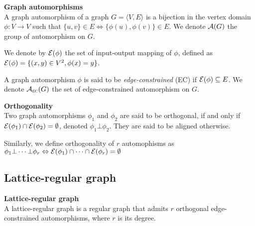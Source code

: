 
\begin{definition}\textbf{Graph automorphisms}\\
A graph automorphism of a graph $G = \langle V,E \rangle$ is a bijection in the vertex domain $\phi: V \rightarrow V$ such that $\{u,v\} \in E \Leftrightarrow \{\phi(u), \phi(v)\} \in E$. We denote $\mathcal{A}(G)$ the group of automorphism on $G$.

We denote by $\mathcal{E}(\phi)$ the set of input-output mapping of $\phi$, defined as $\mathcal{E}(\phi) = \{ (x,y) \in V^2, \phi(x) = y \}$.

A graph automorphism $\phi$ is said to be \emph{edge-constrained} (EC) if $\mathcal{E}(\phi) \subseteq E$. We denote $\mathcal{A}_{\operatorname{\textsc{ec}}}(G)$ the set of edge-constrained automorphism on $G$.
\end{definition}

\begin{definition}\textbf{Orthogonality}\\
Two graph automorphisms $\phi_1$ and $\phi_2$ are said to be orthogonal, if and only if $\mathcal{E}(\phi_1) \cap \mathcal{E}(\phi_2) = \emptyset$, denoted $\phi_1 \bot \phi_2$. They are said to be aligned otherwise.

Similarly, we define orthogonality of $r$ automophisms as $\phi_1 \bot \cdots \bot \phi_r \Leftrightarrow \mathcal{E}(\phi_1) \cap \cdots \cap \mathcal{E}(\phi_r) = \emptyset$
\end{definition}


\subsection{Lattice-regular graph}


\begin{definition}\textbf{Lattice-regular graph}\\
A lattice-regular graph is a regular graph that admits $r$ orthogonal edge-constrained automorphisms, where $r$ is its degree.
\end{definition}





